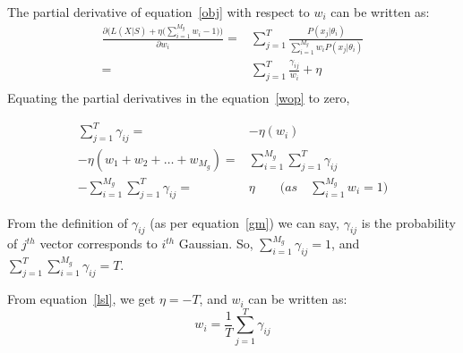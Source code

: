 \begin{spacing}{1.5}
The partial derivative of equation~\ref{obj} with respect to $w_{i}$ can be written as:
\begin{equation}
\begin{aligned}
\label{wop}
\frac{\partial \Bigg(L(X|S)+\eta \Bigg(\sum_{i=1}^{M_{g}}w_{i}-1 \Bigg)\Bigg)}{\partial w_{i}}=&\sum_{j=1}^{T}\frac{P(x_{j}|\theta_{i})}{\sum_{i=1}^{M_{g}} w_{i}P(x_{j}|\theta_{i})}\\
 =&\sum_{j=1}^{T} \frac{\gamma_{ij}}{w_{i}}+\eta\\
\end{aligned}
\end{equation}
Equating the partial derivatives in the equation~\ref{wop} to zero, 

\begin{equation}
\label{lsl}
    \begin{aligned}
     \sum_{j=1}^{T}\gamma_{ij}=&-\eta(w_{i})\\
     -\eta (w_{1}+w_{2}+\ldots+w_{M_{g}})=&\sum_{i=1}^{M_{g}}\sum_{j=1}^{T}\gamma_{ij}\\
    - \sum_{i=1}^{M_{g}}\sum_{j=1}^{T}\gamma_{ij}=&\eta \quad \quad  \Bigg(as \quad \sum_{i=1}^{M_{g}}w_{i}=1\Bigg)
    \end{aligned}
\end{equation}

From the definition of $\gamma_{ij}$ (as per equation~\ref{gm}) we can say, $\gamma_{ij}$ is the probability of $j^{th}$ vector corresponds to $i^{th}$ Gaussian. So, $\sum_{i=1}^{M_{g}}\gamma_{ij}=1$, and $\sum_{j=1}^{T}\sum_{i=1}^{M_{g}}\gamma_{ij}=T$.

From equation~\ref{lsl}, we get $\eta = -T$, and $w_{i}$ can be written as:
\begin{equation}
w_{i}=\frac{1}{T}\sum_{j=1}^{T}\gamma_{ij}
\end{equation}


\end{spacing}
